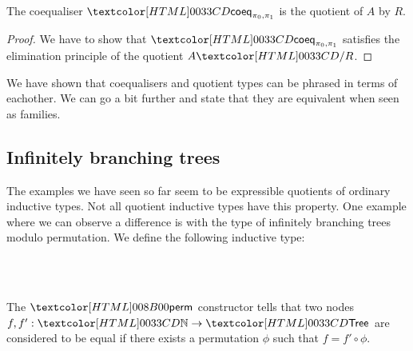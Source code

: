\begin{proposition}
  The coequaliser $\coeqty{\pi_0}{\pi_1}$ is the quotient of $A$ by
  $R$.
\end{proposition}

\begin{proof}
  We have to show that $\coeqty{\pi_0}{\pi_1}$ satisfies the
  elimination principle of the quotient $\quotty{A}{R}$.
\end{proof}

We have shown that coequalisers and quotient types can be phrased in
terms of eachother. We can go a bit further and state that they are
equivalent when seen as families.

\subsection{Infinitely branching trees}

The examples we have seen so far seem to be expressible quotients of
ordinary inductive types. Not all quotient inductive types have this
property. One example where we can observe a difference is with the
type of infinitely branching trees modulo permutation. We define the
following inductive type:
%
\begin{datatype}{\treety}{\Set}
  \constr{\treeleaf}{\treety} \\
  \constr{\treenode}{(\natty \to \treety) \to \treety} \\
\end{datatype}

The $\treeperm$ constructor tells that two nodes
$f, f' : \natty \to \treety$ are considered to be equal if there
exists a permutation $\phi$ such that $f = f' \circ \phi$.

